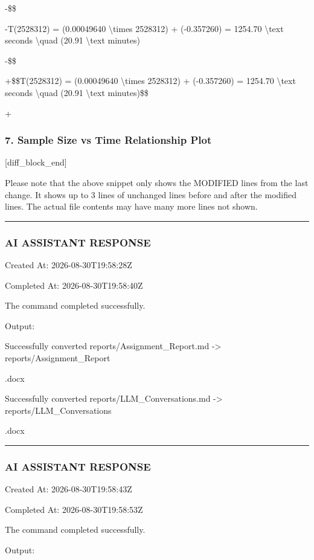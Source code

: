 \documentclass[11pt,a4paper]{article}
\begin{document}
{-\$\$

-T(2528312) = (0.00049640 \textbackslash{}times 2528312) + (-0.357260) = 1254.70 \textbackslash{}text{ seconds} \textbackslash{}quad (20.91 \textbackslash{}text{ minutes})

-\$\$

+\$\$T(2528312) = (0.00049640 \textbackslash{}times 2528312) + (-0.357260) = 1254.70 \textbackslash{}text{ seconds} \textbackslash{}quad (20.91 \textbackslash{}text{ minutes})\$\$

+



\subsubsection{7. Sample Size vs Time Relationship Plot}
[diff\_block\_end]


Please note that the above snippet only shows the MODIFIED lines from the last change. It shows up to 3 lines of unchanged lines before and after the modified lines. The actual file contents may have many more lines not shown.


\hrule

\subsubsection{AI ASSISTANT RESPONSE}

Created At: 2026-08-30T19:58:28Z

Completed At: 2026-08-30T19:58:40Z


The command completed successfully.

Output:

Successfully converted reports/Assignment\_Report.md -> reports/Assignment\_Report

.docx

Successfully converted reports/LLM\_Conversations.md -> reports/LLM\_Conversations

.docx


\hrule

\subsubsection{AI ASSISTANT RESPONSE}

Created At: 2026-08-30T19:58:43Z

Completed At: 2026-08-30T19:58:53Z


The command completed successfully.

Output:

}
\end{document}
